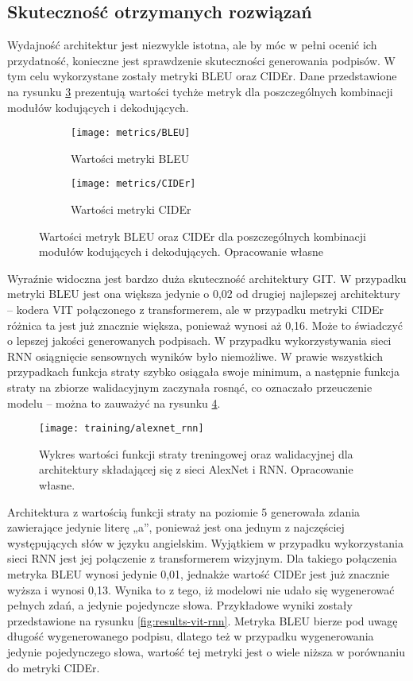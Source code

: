 \subsection{Skuteczność otrzymanych rozwiązań}
Wydajność architektur jest niezwykle istotna, ale by móc w pełni ocenić ich przydatność, konieczne jest sprawdzenie skuteczności generowania podpisów. W tym celu wykorzystane zostały metryki BLEU oraz CIDEr. Dane przedstawione na rysunku \ref{fig:metrics} prezentują wartości tychże metryk dla poszczególnych kombinacji modułów kodujących i dekodujących.
\begin{figure}[H]
    \centering
    \begin{subfigure}{.5\textwidth}
        \centering
        \texttt{[image: metrics/BLEU]}
        \caption{Wartości metryki BLEU}
        \label{fig:bleu}
    \end{subfigure}%
    \centering
    \begin{subfigure}{.5\textwidth}
        \centering
        \texttt{[image: metrics/CIDEr]}
        \caption{Wartości metryki CIDEr}
        \label{fig:cider}
    \end{subfigure}%
    \caption{Wartości metryk BLEU oraz CIDEr dla poszczególnych kombinacji modułów kodujących i dekodujących. Opracowanie własne}
    \label{fig:metrics}
\end{figure}
\noindent Wyraźnie widoczna jest bardzo duża skuteczność architektury GIT. W przypadku metryki BLEU jest ona większa jedynie o 0,02 od drugiej najlepszej architektury -- kodera VIT połączonego z transformerem, ale w przypadku metryki CIDEr różnica ta jest już znacznie większa, ponieważ wynosi aż 0,16. Może to świadczyć o lepszej jakości generowanych podpisach.
W przypadku wykorzystywania sieci RNN osiągnięcie sensownych wyników było niemożliwe. W prawie wszystkich przypadkach funkcja straty szybko osiągała swoje minimum, a następnie funkcja straty na zbiorze walidacyjnym zaczynała rosnąć, co oznaczało przeuczenie modelu -- można to zauważyć na rysunku \ref{fig:training-alexnet-rnn}.
\begin{figure}[H]
    \centering
    \texttt{[image: training/alexnet\_rnn]}
    \caption{Wykres wartości funkcji straty treningowej oraz walidacyjnej dla architektury składającej się z sieci AlexNet i RNN. Opracowanie własne.}
    \label{fig:training-alexnet-rnn}
\end{figure}
Architektura z wartością funkcji straty na poziomie 5 generowała zdania zawierające jedynie literę „a”, ponieważ jest ona jednym z najczęściej występujących słów w języku angielskim. Wyjątkiem w przypadku wykorzystania sieci RNN jest jej połączenie z transformerem wizyjnym. Dla takiego połączenia metryka BLEU wynosi jedynie 0,01, jednakże wartość CIDEr jest już znacznie wyższa i wynosi 0,13. Wynika to z tego, iż modelowi nie udało się wygenerować pełnych zdań, a jedynie pojedyncze słowa. Przykładowe wyniki zostały przedstawione na rysunku \ref{fig:results-vit-rnn}. Metryka BLEU bierze pod uwagę długość wygenerowanego podpisu, dlatego też w przypadku wygenerowania jedynie pojedynczego słowa, wartość tej metryki jest o wiele niższa w porównaniu do metryki CIDEr.
